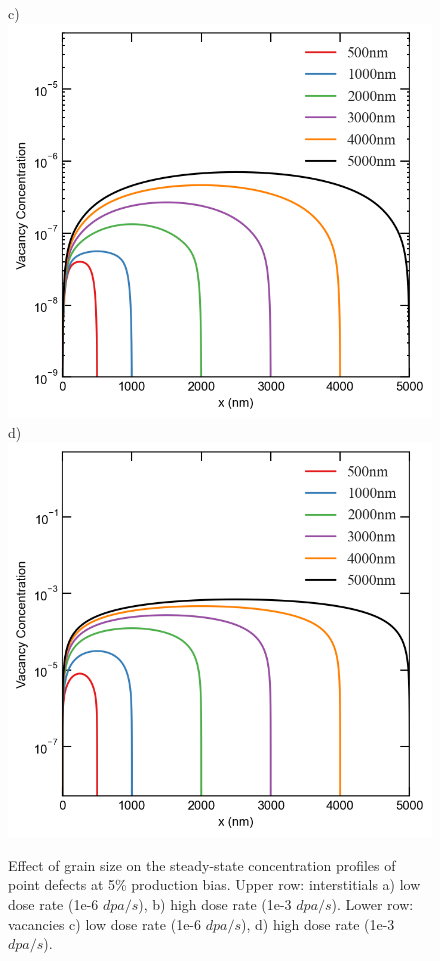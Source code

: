 \documentclass[utf8]{frontiersSCNS} %
\begin{document}
\begin{figure}[h!]
        c)\includegraphics[scale=0.55]{Fig5_c}
        d)\includegraphics[scale=0.55]{Fig5_d}
        \caption{Effect of grain size on the steady-state concentration profiles of point defects at 5\% production bias. Upper row: interstitials a) low dose rate (1e-6 $dpa/s$), b) high dose rate (1e-3 $dpa/s$). Lower row: vacancies c) low dose rate (1e-6 $dpa/s$), d) high dose rate (1e-3 $dpa/s$).} %
        \label{figure:concentrations_neutron_5}
    \end{figure}
\end{document}
